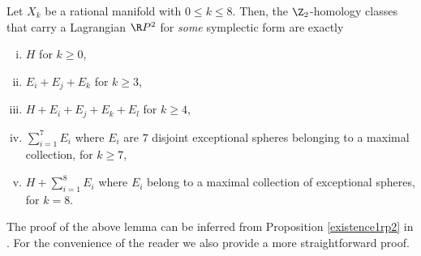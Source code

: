 \begin{lemma}\label{existence1rp2}
Let $X_k$ be a rational manifold with $0\leq k\leq 8$. Then, the $\Z_2$-homology classes that carry a Lagrangian $\R P^2$ for \textit{some} symplectic form are exactly
\begin{enumerate}[i)]
    \item $H$ for $k\geq 0$,
    \item $E_i+E_j+E_k$ for $k\geq 3$,
    \item $H+E_i+E_j+E_k+E_l$ for $k\geq 4$,
    \item $\sum_{i=1}^7 E_i$ where $E_i$ are $7$ disjoint exceptional spheres belonging to a maximal collection, for $k\geq 7$,
    \item $H+\sum_{i=1}^{8} E_i$ where $E_i$ belong to a maximal collection of exceptional spheres, for $k=8$.
\end{enumerate}
\end{lemma}

The proof of the above lemma can be inferred from Proposition \ref{existence1rp2} in \cite{DHL}. For the convenience of the reader we also provide a more straightforward proof. 

